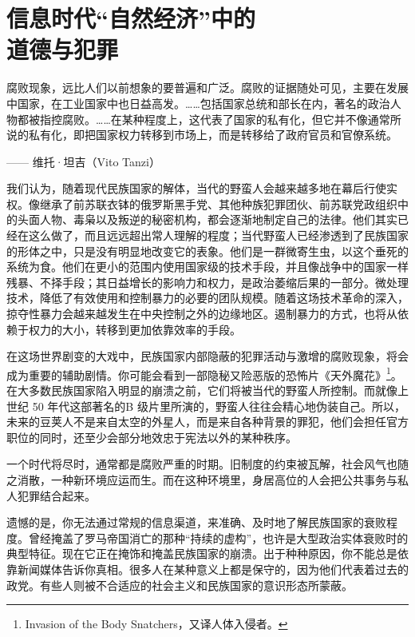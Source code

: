 \chapter{信息时代“自然经济”中的\\道德与犯罪}

\begin{tcolorbox}
腐败现象，远比人们以前想象的要普遍和广泛。腐败的证据随处可见，主要在发展中国家，在工业国家中也日益高发。……包括国家总统和部长在内，著名的政治人物都被指控腐败。……在某种程度上，这代表了国家的私有化，但它并不像通常所说的私有化，即把国家权力转移到市场上，而是转移给了政府官员和官僚系统。
\begin{flushright}
—— 维托·坦吉（Vito Tanzi）
\end{flushright}
\end{tcolorbox}


我们认为，随着现代民族国家的解体，当代的野蛮人会越来越多地在幕后行使实权。像继承了前苏联衣钵的俄罗斯黑手党、其他种族犯罪团伙、前苏联党政组织中的头面人物、毒枭以及叛逆的秘密机构，都会逐渐地制定自己的法律。他们其实已经在这么做了，而且远远超出常人理解的程度；当代野蛮人已经渗透到了民族国家的形体之中，只是没有明显地改变它的表象。他们是一群微寄生虫，以这个垂死的系统为食。他们在更小的范围内使用国家级的技术手段，并且像战争中的国家一样残暴、不择手段；其日益增长的影响力和权力，是政治萎缩后果的一部分。微处理技术，降低了有效使用和控制暴力的必要的团队规模。随着这场技术革命的深入，掠夺性暴力会越来越发生在中央控制之外的边缘地区。遏制暴力的方式，也将从依赖于权力的大小，转移到更加依靠效率的手段。

在这场世界剧变的大戏中，民族国家内部隐蔽的犯罪活动与激增的腐败现象，将会成为重要的辅助剧情。你可能会看到一部隐秘又险恶版的恐怖片《天外魔花》\footnote{Invasion of the Body Snatchers，又译人体入侵者。}。在大多数民族国家陷入明显的崩溃之前，它们将被当代的野蛮人所控制。而就像上世纪 50 年代这部著名的B 级片里所演的，野蛮人往往会精心地伪装自己。所以，未来的豆荚人不是来自太空的外星人，而是来自各种背景的罪犯，他们会担任官方职位的同时，还至少会部分地效忠于宪法以外的某种秩序。

一个时代将尽时，通常都是腐败严重的时期。旧制度的约束被瓦解，社会风气也随之消散，一种新环境应运而生。而在这种环境里，身居高位的人会把公共事务与私人犯罪结合起来。

遗憾的是，你无法通过常规的信息渠道，来准确、及时地了解民族国家的衰败程度。曾经掩盖了罗马帝国消亡的那种“持续的虚构”，也许是大型政治实体衰败时的典型特征。现在它正在掩饰和掩盖民族国家的崩溃。出于种种原因，你不能总是依靠新闻媒体告诉你真相。很多人在某种意义上都是保守的，因为他们代表着过去的政党。有些人则被不合适应的社会主义和民族国家的意识形态所蒙蔽。

